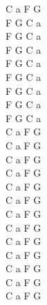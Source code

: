 \documentclass[a5paper, 10pt]{book}
\begin{document}
\begin{minipage}[t]{0.2\textwidth}
C a F G\\

F G C a\\
F G C a\\
F G C a\\
F G C a\\
F G C a\\
F G C a\\
F G C a\\
F G C a\\

C a F G\\

C a F G\\
C a F G\\

C a F G\\
C a F G\\

C a F G\\
C a F G\\
C a F G\\
C a F G\\

C a F G\\
C a F G\\
C a F G\\
C a F G\\

\end{minipage}

\newpage
\end{document}
